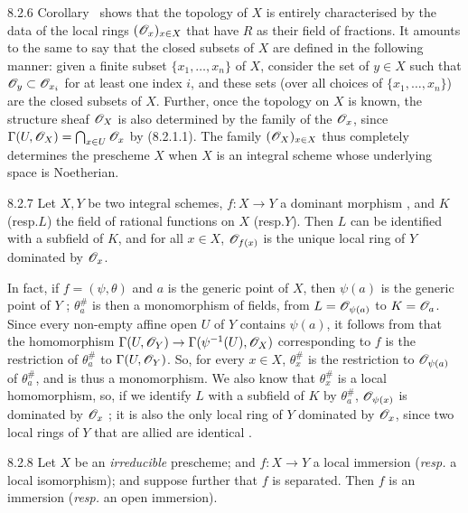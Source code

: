 \documentclass{book}
\begin{document}
\begin{env}{8.2.6}
\label{env-1.8.2.6}
Corollary~ shows that the topology of $X$ is
entirely characterised by the data of the local rings $(\mathscr{O}_x)_{x\in X}$ that
have $R$ as their field of fractions. It amounts to the same to say that the
closed subsets of $X$ are defined in the following manner: given a finite subset
$\{x_1,\ldots,x_n\}$ of $X$, consider the set of $y\in X$ such that
$\mathscr{O}_y\subset\mathscr{O}_{x_i}$ for at least one index $i$, and these sets (over all
choices of $\{x_1,\ldots,x_n\}$) are the closed subsets of $X$. Further, once
the topology on $X$ is known, the structure sheaf $\mathscr{O}_X$ is also determined by
the family of the $\mathscr{O}_x$, since $\Gamma(U,\mathscr{O}_X)=\bigcap_{x\in U}\mathscr{O}_x$ by
(8.2.1.1). The family $(\mathscr{O}_X)_{x\in X}$ thus completely determines the
prescheme $X$ when $X$ is an integral scheme whose underlying space is
Noetherian.
\end{env}

\begin{envs}[Proposition]{8.2.7}
\label{prop-1.8.2.7}
Let $X,Y$ be two integral schemes, $f\colon X\to Y$ a dominant morphism
, and $K$ (resp.$L$) the field of rational
functions on $X$ (resp.$Y$). Then $L$ can be identified with a subfield of
$K$, and for all $x\in X$, $\mathscr{O}_{f(x)}$ is the unique local ring of $Y$ dominated
by $\mathscr{O}_x$.
\end{envs}

In fact, if $f=(\psi,\theta)$ and $a$ is the generic point of $X$, then
$\psi(a)$ is the generic point of $Y$ ; $\theta_a^\#$ is then
a monomorphism of fields, from $L=\mathscr{O}_{\psi(a)}$ to $K=\mathscr{O}_a$. Since every
non-empty affine open $U$ of $Y$ contains $\psi(a)$, it follows from
 that the homomorphism $\Gamma(U,\mathscr{O}_Y)\to\Gamma(\psi^{-1}(U),\mathscr{O}_X)$
corresponding to $f$ is the restriction of $\theta_a^\#$ to $\Gamma(U,\mathscr{O}_Y)$.
So, for every $x\in X$, $\theta_x^\#$ is the restriction to $\mathscr{O}_{\psi(a)}$ of
$\theta_a^\#$, and is thus a monomorphism. We also know that $\theta_x^\#$ is a
local homomorphism, so, if we identify $L$ with a subfield of $K$ by
$\theta_a^\#$, $\mathscr{O}_{\psi(x)}$ is dominated by $\mathscr{O}_x$ ; it is also
the only local ring of $Y$ dominated by $\mathscr{O}_x$, since two local rings of $Y$
that are allied are identical .

\begin{envs}[Proposition]{8.2.8}
\label{prop-1.8.2.8}
Let $X$ be an \emph{irreducible} prescheme; and
$f\colon X\to Y$ a local immersion (\emph{resp.} a local isomorphism); and
suppose further that $f$ is separated. Then $f$ is an immersion (\emph{resp.}
an open immersion).
\end{envs}
\end{document}
